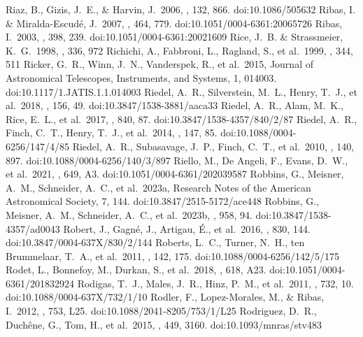 \documentclass[twocolumn,tighten,twocolappendix]{aastex631}
\begin{document}
\begin{thebibliography}{}
 Riaz, B., Gizis, J.~E., \& Harvin, J.\ 2006, \aj, 132, 866. doi:10.1086/505632
 Ribas, I. \& Miralda-Escud{\'e}, J.\ 2007, \aap, 464, 779. doi:10.1051/0004-6361:20065726
 Ribas, I.\ 2003, \aap, 398, 239. doi:10.1051/0004-6361:20021609
 Rice, J.~B. \& Strassmeier, K.~G.\ 1998, \aap, 336, 972
 Richichi, A., Fabbroni, L., Ragland, S., et al.\ 1999, \aap, 344, 511
 Ricker, G.~R., Winn, J.~N., Vanderspek, R., et al.\ 2015, Journal of Astronomical Telescopes, Instruments, and Systems, 1, 014003. doi:10.1117/1.JATIS.1.1.014003
 Riedel, A.~R., Silverstein, M.~L., Henry, T.~J., et al.\ 2018, \aj, 156, 49. doi:10.3847/1538-3881/aaca33
 Riedel, A.~R., Alam, M.~K., Rice, E.~L., et al.\ 2017, \apj, 840, 87. doi:10.3847/1538-4357/840/2/87
 Riedel, A.~R., Finch, C.~T., Henry, T.~J., et al.\ 2014, \aj, 147, 85. doi:10.1088/0004-6256/147/4/85
 Riedel, A.~R., Subasavage, J.~P., Finch, C.~T., et al.\ 2010, \aj, 140, 897. doi:10.1088/0004-6256/140/3/897
 Riello, M., De Angeli, F., Evans, D.~W., et al.\ 2021, \aap, 649, A3. doi:10.1051/0004-6361/202039587
 Robbins, G., Meisner, A.~M., Schneider, A.~C., et al.\ 2023a, Research Notes of the American Astronomical Society, 7, 144. doi:10.3847/2515-5172/ace448
 Robbins, G., Meisner, A.~M., Schneider, A.~C., et al.\ 2023b, \apj, 958, 94. doi:10.3847/1538-4357/ad0043
 Robert, J., Gagn{\'e}, J., Artigau, {\'E}., et al.\ 2016, \apj, 830, 144. doi:10.3847/0004-637X/830/2/144
 Roberts, L.~C., Turner, N.~H., ten Brummelaar, T.~A., et al.\ 2011, \aj, 142, 175. doi:10.1088/0004-6256/142/5/175
 Rodet, L., Bonnefoy, M., Durkan, S., et al.\ 2018, \aap, 618, A23. doi:10.1051/0004-6361/201832924
 Rodigas, T.~J., Males, J.~R., Hinz, P.~M., et al.\ 2011, \apj, 732, 10. doi:10.1088/0004-637X/732/1/10
 Rodler, F., Lopez-Morales, M., \& Ribas, I.\ 2012, \apjl, 753, L25. doi:10.1088/2041-8205/753/1/L25
 Rodriguez, D.~R., Duch{\^e}ne, G., Tom, H., et al.\ 2015, \mnras, 449, 3160. doi:10.1093/mnras/stv483

\end{thebibliography}
\end{document}

